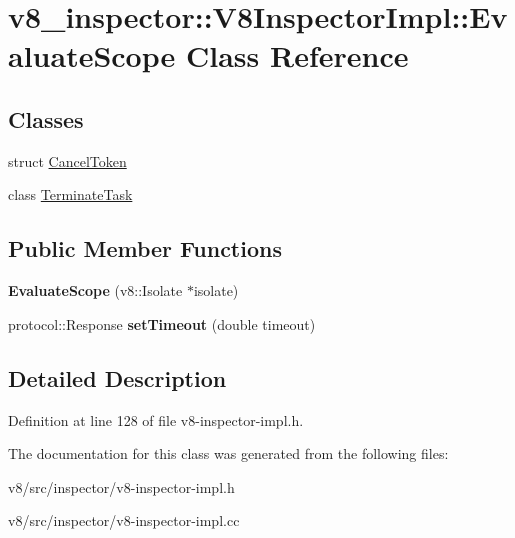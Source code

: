 \hypertarget{classv8__inspector_1_1V8InspectorImpl_1_1EvaluateScope}{}\section{v8\+\_\+inspector\+:\+:V8\+Inspector\+Impl\+:\+:Evaluate\+Scope Class Reference}
\label{classv8__inspector_1_1V8InspectorImpl_1_1EvaluateScope}
\subsection*{Classes}
\begin{DoxyCompactItemize}
\item 
struct \mbox{\hyperlink{structv8__inspector_1_1V8InspectorImpl_1_1EvaluateScope_1_1CancelToken}{Cancel\+Token}}
\item 
class \mbox{\hyperlink{classv8__inspector_1_1V8InspectorImpl_1_1EvaluateScope_1_1TerminateTask}{Terminate\+Task}}
\end{DoxyCompactItemize}
\subsection*{Public Member Functions}
\begin{DoxyCompactItemize}
\item 
\mbox{\label{classv8__inspector_1_1V8InspectorImpl_1_1EvaluateScope_aa08685055411e58fc20a29fe1b265063}} 
{\bfseries Evaluate\+Scope} (v8\+::\+Isolate $\ast$isolate)
\item 
\mbox{\label{classv8__inspector_1_1V8InspectorImpl_1_1EvaluateScope_ae92fad8af2a4b04d2c7b16f29fb97f67}} 
protocol\+::\+Response {\bfseries set\+Timeout} (double timeout)
\end{DoxyCompactItemize}


\subsection{Detailed Description}


Definition at line 128 of file v8-\/inspector-\/impl.\+h.



The documentation for this class was generated from the following files\+:\begin{DoxyCompactItemize}
\item 
v8/src/inspector/v8-\/inspector-\/impl.\+h\item 
v8/src/inspector/v8-\/inspector-\/impl.\+cc\end{DoxyCompactItemize}
